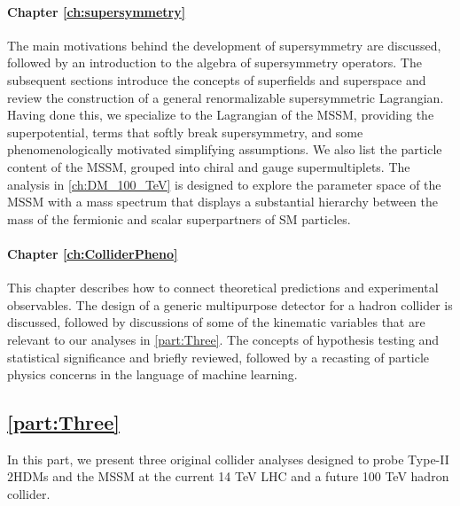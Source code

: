 \paragraph{Chapter \ref{ch:supersymmetry}} The main motivations behind the development of supersymmetry are discussed, followed by an introduction to the algebra of supersymmetry operators. The subsequent sections introduce the concepts of superfields and superspace and review the construction of a general renormalizable supersymmetric Lagrangian. Having done this, we specialize to the Lagrangian of the MSSM, providing the superpotential, terms that softly break supersymmetry, and some phenomenologically motivated simplifying assumptions. We also list the particle content of the MSSM, grouped into chiral and gauge supermultiplets. The analysis in \autoref{ch:DM_100_TeV} is designed to explore the parameter space of the MSSM with a mass spectrum that displays a substantial hierarchy between the mass of the fermionic and scalar superpartners of SM particles.

\paragraph{Chapter \ref{ch:ColliderPheno}} This chapter describes how to connect theoretical predictions and experimental observables. The design of a generic multipurpose detector for a hadron collider is discussed, followed by discussions of some of the kinematic variables that are relevant to our analyses in \autoref{part:Three}. The concepts of hypothesis testing and statistical significance and briefly reviewed, followed by a recasting of particle physics concerns in the language of machine learning.

\subsection{\autoref{part:Three}}
In this part, we present three original collider analyses designed to probe Type-II $2$HDMs and the MSSM at the current 14 TeV LHC and a future 100 TeV hadron collider.

